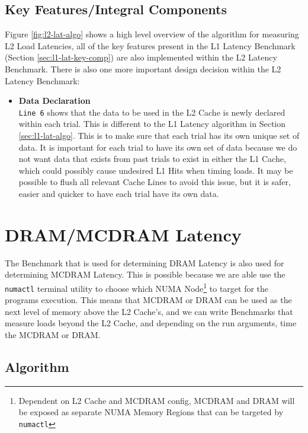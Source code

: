 \documentclass[bsc,frontabs,twoside,singlespacing,parskip,deptreport]{infthesis}     %
\begin{document}
\subsection{Key Features/Integral Components}\label{sec:l2-lat-key-comp}
Figure \ref{fig:l2-lat-algo} shows a high level overview of the algorithm for measuring L2 Load Latencies, all of the key features present in the L1 Latency Benchmark (Section \ref{sec:l1-lat-key-comp}) are also implemented within the L2 Latency Benchmark. There is also one more important design decision within the L2 Latency Benchmark:
\begin{itemize}
    \item{{\bf Data Declaration} \\
    \texttt{Line 6} shows that the data to be used in the L2 Cache is newly declared within each trial. This is different to the L1 Latency algorithm in Section \ref{sec:l1-lat-algo}. This is to make sure that each trial has its own unique set of data. It is important for each trial to have its own set of data because we do not want data that exists from past trials to exist in either the L1 Cache, which could possibly cause undesired L1 Hits when timing loads. It may be possible to flush all relevant Cache Lines to avoid this issue, but it is safer, easier and quicker to have each trial have its own data.
    }\label{data-declaration-consideration-L2}
\end{itemize}


\newpage

\section{DRAM/MCDRAM Latency}\label{mcdram-dram-benchmarks-lat}
The Benchmark that is used for determining DRAM Latency is also used for determining MCDRAM Latency. This is possible because we are able use the \texttt{numactl}\cite{numactl_man} terminal utility to choose which NUMA Node\footnote{Dependent on L2 Cache and MCDRAM config, MCDRAM and DRAM will be exposed as separate NUMA Memory Regions that can be targeted by \texttt{numactl}} to target for the programs execution. This means that MCDRAM or DRAM can be used as the next level of memory above the L2 Cache's, and we can write Benchmarks that measure loads beyond the L2 Cache, and depending on the run arguments, time the MCDRAM or DRAM.
\subsection{Algorithm}
\end{document}
